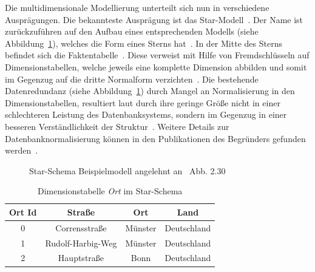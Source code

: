 \documentclass[
  language=german, %
  type=bachelor,%
  ngerman
]{isthesis}
\begin{document}
\begin{content}
	Die multidimensionale Modellierung unterteilt sich nun in verschiedene
	Ausprägungen.  Die bekannteste Ausprägung ist das Star-Modell~\cite[][S.
	2]{phipps2002automating}. Der Name ist zurückzuführen auf den Aufbau eines
	entsprechenden Modells (siehe Abbildung~\ref{fig:star-schema}), welches die
	Form eines Sterns hat~\cite[][S.  44]{Kimball2013}. In der Mitte des Sterns
	befindet sich die Faktentabelle~\cite[][S. 67]{Kemper2010}. Diese verweist
	mit Hilfe von Fremdschlüsseln auf Dimensionstabellen, welche jeweils eine
	komplette Dimension abbilden und somit im Gegenzug auf die dritte Normalform
	verzichten~\cite[][S. 67 f.]{Kemper2010}. Die bestehende Datenredundanz
	(siehe Abbildung~\ref{table:dimension-table}) durch Mangel an Normalisierung
	in den Dimensionstabellen, resultiert laut \textsc{\citeauthor{Kimball2013}}
	durch ihre geringe Größe nicht in einer schlechteren Leistung des
	Datenbanksystems, sondern im Gegenzug in einer besseren Verständlichkeit der
	Struktur~\cite[][S. 15]{Kimball2013}. Weitere Details zur
	Datenbanknormalisierung können in den Publikationen des
	Begründers 
	\textsc{\citeauthor{codd1970relational}} gefunden
	werden~\citeyearpar{codd1970relational,codd1972further}.

  \begin{figure}
    \resizebox{0.5\linewidth}{!}{}
    \caption[Star-Schema Beispielmodell]{Star-Schema Beispielmodell angelehnt an~\cite{Kemper2010} Abb. 2.30}\label{fig:star-schema}
  \end{figure}

  \begin{table}[]
    \footnotesize
    \begin{tabular}{c c c c}
      Ort Id & Straße & Ort & Land \\
      \toprule
      0 & Corrensstraße & Münster & Deutschland \\
      1 & Rudolf-Harbig-Weg & Münster & Deutschland \\
      2 & Hauptstraße & Bonn & Deutschland \\
    \end{tabular}
    \caption{Dimensionstabelle \textit{Ort} im Star-Schema}\label{table:dimension-table}
  \end{table}


\end{content}
\end{document}
